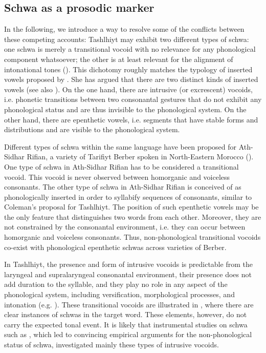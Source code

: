 \subsection{Schwa as a prosodic marker}
In the following, we introduce a way to resolve some of the conflicts between these competing accounts: Tashlhiyt may exhibit two different types of schwa: one schwa is merely a transitional vocoid with no relevance for any phonological component whatsoever; the other is at least relevant for the alignment of intonational tones (\citealt{GordonNafi2012}). This dichotomy roughly matches the typology of inserted vowels proposed by \citet{Hall2006}. She has argued that there are two distinct kinds of inserted vowels (see also \citealt{Harms1976,Levin1987,Warner.etal2001,Silverman2011}). On the one hand, there are intrusive (or excrescent) vocoids, i.e. phonetic transitions between two consonantal gestures that do not exhibit any phonological status and are thus invisible to the phonological system. On the other hand, there are epenthetic vowels, i.e. segments that have stable forms and distributions and are visible to the phonological system. 

Different types of schwa within the same language have been proposed for Ath-Sidhar Rifian, a variety of Tarifiyt Berber spoken in North-Eastern Morocco (\citealt{DellTangi1992,DE2002}). One type of schwa in Ath-Sidhar Rifian has to be considered a transitional vocoid. This vocoid is never observed between homorganic and voiceless consonants. The other type of schwa in Ath-Sidhar Rifian is conceived of as phonologically inserted in order to syllabify sequences of consonants, similar to Coleman’s proposal for Tashlhiyt. The position of such epenthetic vowels may be the only feature that distinguishes two words from each other. Moreover, they are not constrained by the consonantal environment, i.e. they can occur between homorganic and voiceless consonants. Thus, non-phonological transitional vocoids co-exist with phonological epenthetic schwas across varieties of Berber.

In Tashlhiyt, the presence and form of intrusive vocoids is predictable from the laryngeal and supralaryngeal consonantal environment, their presence does not add duration to the syllable, and they play no role in any aspect of the phonological system, including versification, morphological processes, and intonation (e.g. \citealt{DE2002,DE2008,Ridouane2008,RidouaneFougeron2011}). These transitional vocoids are illustrated in , where there are clear instances of schwas in the target word. These elements, however, do not carry the expected tonal event. It is likely that instrumental studies on schwa such as \citet{RidouaneFougeron2011}, which led to convincing empirical arguments for the non-phonological status of schwa, investigated mainly these types of intrusive vocoids. 


